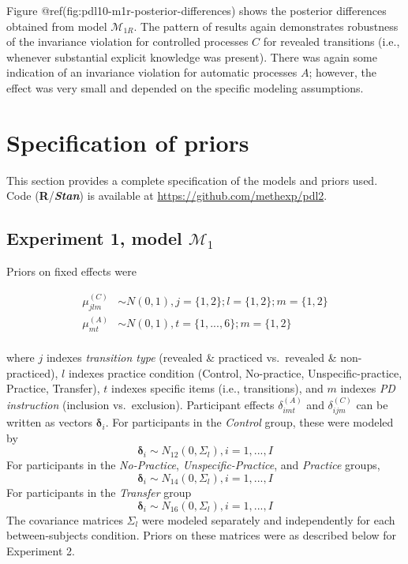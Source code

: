 \begin{appendix}
Figure @ref(fig:pdl10-m1r-posterior-differences) shows the posterior
differences obtained from model \(\mathcal{M}_{1R}\). The pattern of
results again demonstrates robustness of the invariance violation for
controlled processes \(C\) for revealed transitions (i.e., whenever
substantial explicit knowledge was present). There was again some
indication of an invariance violation for automatic processes \(A\);
however, the effect was very small and depended on the specific modeling
assumptions.

\hypertarget{specification-of-priors}{%
\section{Specification of priors}\label{specification-of-priors}}

This section provides a complete specification of the models and priors
used. Code (\textbf{\textsf{R}}/\textbf{\textit{Stan}}) is available at
\url{https://github.com/methexp/pdl2}.

\hypertarget{experiment-1-model-mathcalm_1-1}{%
\subsection{\texorpdfstring{Experiment 1, model
\(\mathcal{M}_1\)}{Experiment 1, model \textbackslash{}mathcal\{M\}\_1}}\label{experiment-1-model-mathcalm_1-1}}

Priors on fixed effects were

\[
\begin{aligned}
\mu_{jlm}^{(C)} & \sim N(0, 1), j = \lbrace 1, 2 \rbrace; l = \lbrace 1, 2 \rbrace; m = \lbrace 1, 2 \rbrace\\
\mu_{mt}^{(A)} & \sim N(0, 1), t = \lbrace 1, ..., 6 \rbrace ; m = \lbrace 1, 2 \rbrace\\
\end{aligned}
\]

where \(j\) indexes \emph{transition type} (revealed \& practiced
vs.~revealed \& non-practiced), \(l\) indexes practice condition
(Control, No-practice, Unspecific-practice, Practice, Transfer), \(t\)
indexes specific items (i.e., transitions), and \(m\) indexes \emph{PD
instruction} (inclusion vs.~exclusion). Participant effects
\(\delta_{imt}^{(A)}\) and \(\delta_{ijm}^{(C)}\) can be written as
vectors \(\boldsymbol{\delta}_i\). For participants in the
\emph{Control} group, these were modeled by \[
\boldsymbol{\delta}_i \sim N_{12} (0, \Sigma_l), i = 1, ..., I
\] For participants in the \emph{No-Practice},
\emph{Unspecific-Practice}, and \emph{Practice} groups, \[
\boldsymbol{\delta}_i \sim N_{14} (0, \Sigma_l), i = 1, ..., I
\] For participants in the \emph{Transfer} group \[
\boldsymbol{\delta}_i \sim N_{16} (0, \Sigma_l), i = 1, ..., I
\] The covariance matrices \(\Sigma_l\) were modeled separately and
independently for each between-subjects condition. Priors on these
matrices were as described below for Experiment 2.


\end{appendix}
